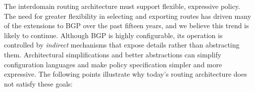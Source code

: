 
The interdomain routing architecture must support flexible, expressive
policy.  The need for greater flexibility in selecting and exporting
routes has driven many of the extensions to BGP over the past fifteen
years, and we believe this trend is likely to continue.  Although BGP is
highly configurable, its operation is controlled by {\em indirect\/}
mechanisms that expose details rather than abstracting them.
Architectural simplifications and better abstractions can simplify
configuration languages and make policy specification simpler and more
expressive.  The following points illustrate why today's routing
architecture does not satisfy these goals:


